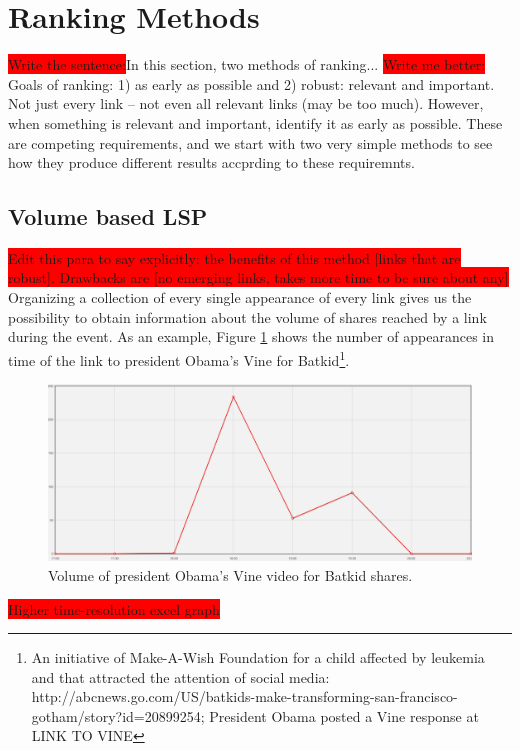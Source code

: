 \documentclass{sig-alternate}
\newcommand{\todo}[1]{\colorbox{red}{#1}}
\begin{document}
\section{Ranking Methods}
\label{sec:ranking_methods}
\todo{Write the sentence:}In this section, two methods of ranking...
\todo{Write me better:} Goals of ranking: 1) as early as possible and 2) robust: relevant and important. Not just every link -- not even all relevant links (may be too much). However, when something is relevant and important, identify it as early as possible. These are competing requirements, and we start with two very simple methods to see how they produce different results accprding to these requiremnts.


\subsection{Volume based LSP}
\label{sec:volume_based_links_selection}
\todo{Edit this para to say explicitly: the benefits of this method [links that are robust]. Drawbacks are [no emerging links, takes more time to be sure about any]}
Organizing a collection of every single appearance of every link gives us the possibility to obtain information about the volume of shares reached by a link during the event. As an example, Figure \ref{fig:batkid_whitehouse_volume} shows the number of appearances in time of the link to president Obama's Vine for Batkid\footnote{An initiative of Make-A-Wish Foundation for a child affected by leukemia and that attracted the attention of social media: http://abcnews.go.com/US/batkids-make-transforming-san-francisco-gotham/story?id=20899254; President Obama posted a Vine response at LINK TO VINE}.
\begin{figure}[htbp]
  \centering
  \includegraphics[width=\linewidth]{Figures/batkid_whitehouse_volume.png}
  \caption{Volume of president Obama's Vine video for Batkid shares.}
  \label{fig:batkid_whitehouse_volume}
\end{figure} \todo{Higher time-resolution excel graph}
\end{document}
